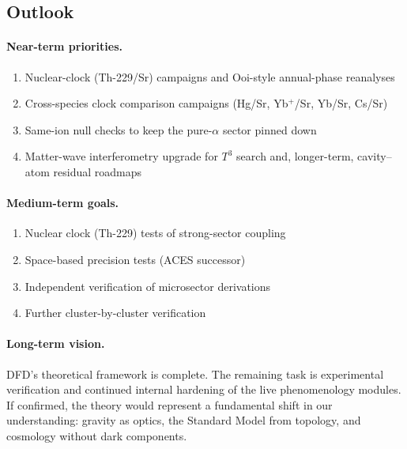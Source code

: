 \subsection{Outlook}\label{sec:conclusions-outlook}

\paragraph{Near-term priorities.}
\begin{enumerate}
\item Nuclear-clock (Th-229/Sr) campaigns and Ooi-style annual-phase reanalyses
\item Cross-species clock comparison campaigns (Hg/Sr, Yb$^+$/Sr, Yb/Sr, Cs/Sr)
\item Same-ion null checks to keep the pure-$\alpha$ sector pinned down
\item Matter-wave interferometry upgrade for $T^3$ search and, longer-term, cavity--atom residual roadmaps
\end{enumerate}

\paragraph{Medium-term goals.}
\begin{enumerate}
\item Nuclear clock (Th-229) tests of strong-sector coupling
\item Space-based precision tests (ACES successor)
\item Independent verification of microsector derivations
\item Further cluster-by-cluster verification
\end{enumerate}

\paragraph{Long-term vision.}
DFD's theoretical framework is complete. The remaining task is experimental verification and continued internal hardening of the live phenomenology modules. If confirmed, the theory would represent a fundamental shift in our understanding: gravity as optics, the Standard Model from topology, and cosmology without dark components.

